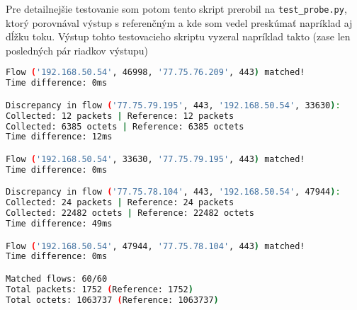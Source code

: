 \documentclass[a4paper, 12pt]{article}
\begin{document}
Pre detailnejšie testovanie som potom tento skript prerobil na \texttt{test\_probe.py}, ktorý porovnával výstup s referenčným a kde som vedel preskúmať napríklad aj dĺžku toku. Výstup tohto testovacieho skriptu vyzeral napríklad takto (zase len posledných pár riadkov výstupu)
\begin{lstlisting}[language=bash,basicstyle=\footnotesize]
Flow ('192.168.50.54', 46998, '77.75.76.209', 443) matched!
Time difference: 0ms

Discrepancy in flow ('77.75.79.195', 443, '192.168.50.54', 33630):
Collected: 12 packets | Reference: 12 packets
Collected: 6385 octets | Reference: 6385 octets
Time difference: 12ms

Flow ('192.168.50.54', 33630, '77.75.79.195', 443) matched!
Time difference: 0ms

Discrepancy in flow ('77.75.78.104', 443, '192.168.50.54', 47944):
Collected: 24 packets | Reference: 24 packets
Collected: 22482 octets | Reference: 22482 octets
Time difference: 49ms

Flow ('192.168.50.54', 47944, '77.75.78.104', 443) matched!
Time difference: 0ms

Matched flows: 60/60
Total packets: 1752 (Reference: 1752)
Total octets: 1063737 (Reference: 1063737)
\end{lstlisting}

\newpage
\end{document}
